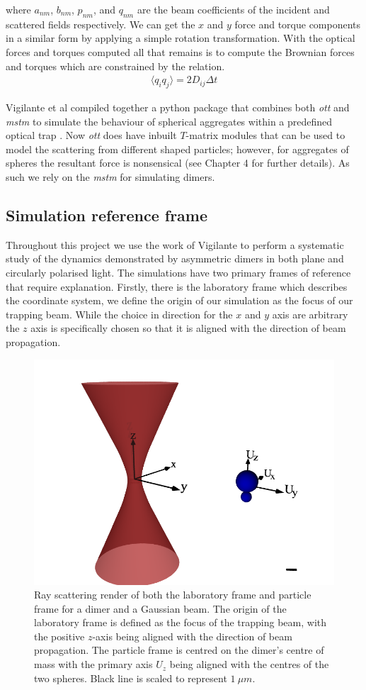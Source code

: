 where $a_{nm}$, $b_{nm}$, $p_{nm}$, and $q_{nm}$ are the beam 
coefficients of the incident and scattered fields respectively. 
We can get the $x$ and $y$ force and torque components in a 
similar form by applying a simple rotation transformation. With 
the optical forces and torques computed all that remains is to 
compute the Brownian forces and torques which are constrained 
by the relation.
\begin{align}
	\langle q_iq_j\rangle =2D_{ij}\Delta t
\end{align}

Vigilante et al compiled together a python package that combines 
both \textit{ott} and \textit{mstm} to simulate the behaviour of 
spherical aggregates within a predefined optical trap 
\cite{Vigilante2020}. Now \textit{ott} does have inbuilt $T$-matrix 
modules that can be used to model the scattering from different 
shaped particles; however, for aggregates of spheres the resultant 
force is nonsensical (see Chapter 4 for further details). As such 
we rely on the \textit{mstm} for simulating dimers.  

\subsection{Simulation reference frame}
\label{sec:sim_parameters}
Throughout this project we use the work of Vigilante to perform a 
systematic study of the dynamics demonstrated by asymmetric dimers 
in both plane and circularly polarised light. The simulations have 
two primary frames of reference that require explanation. Firstly, 
there is the laboratory frame which describes the coordinate system, 
we define the origin of our simulation as the focus of our trapping 
beam. While the choice in direction for the $x$ and $y$ axis are 
arbitrary the $z$ axis is specifically chosen so that it is aligned 
with the direction of beam propagation. 
\begin{figure}[h!]
	\centering
	\includegraphics[width=0.6\linewidth]{lab_frame.png}
	\caption{Ray scattering render of both the laboratory frame and 
		particle frame for a dimer and a Gaussian beam. The origin 
		of the laboratory frame is defined as the focus of the 
		trapping beam, with the positive $z$-axis being aligned with 
		the direction of beam propagation. The particle frame is 
		centred on the dimer's centre of mass with the primary axis 
		$U_z$ being aligned with the centres of the two spheres. Black 
		line is scaled to represent $1\ \mu m$.}
	\label{fig:lab_frame} 
\end{figure} 

